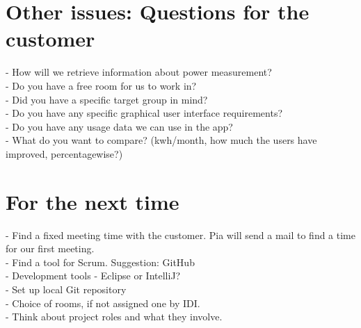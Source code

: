 \documentclass[12pt]{article}
\begin{document}
\section{Other issues: Questions for the customer}
- How will we retrieve information about power measurement?\\
- Do you have a free room for us to work in?\\
- Did you have a specific target group in mind?\\
- Do you have any specific graphical user interface requirements?\\
- Do you have any usage data we can use in the app?\\
- What do you want to compare? (kwh/month, how much the users have improved, percentagewise?)


\section{For the next time}
- Find a fixed meeting time with the customer. Pia will send a mail to find a time for our first meeting.\\
- Find a tool for Scrum. Suggestion: GitHub\\
- Development tools - Eclipse or IntelliJ?\\
- Set up local Git repository\\
- Choice of rooms, if not assigned one by IDI.\\
- Think about project roles and what they involve.\\
\end{document}
